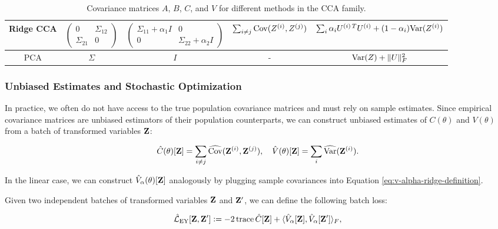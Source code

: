 \begin{table}[h]
\begin{tabular}{|c|c|c|c|c|}
    \hline
    Ridge CCA & $\begin{pmatrix} 
    0 & \Sigma_{12} \\
    \Sigma_{21} & 0
    \end{pmatrix}$ & $\begin{pmatrix}
    \Sigma_{11} + \alpha_1 I & 0 \\
    0 & \Sigma_{22} + \alpha_2 I
    \end{pmatrix}$ & $\sum_{i \neq j} \mathrm{Cov}(Z^{(i)}, Z^{(j)})$ & $\sum_i \alpha_i {U^{(i)\,T}} U^{(i)} +  (1 - \alpha_i) \mathrm{Var}(Z^{(i)})$ \\
    \hline
    PCA & $\Sigma$ & $I$ & - & $\mathrm{Var}(Z) + \|U\|_F^2$ \\
    \hline
    \end{tabular}
    \caption{Covariance matrices $A$, $B$, $C$, and $V$ for different methods in the CCA family.}
    \label{tab:covariance-matrices}
    \end{table}

\subsubsection{Unbiased Estimates and Stochastic Optimization}

In practice, we often do not have access to the true population covariance matrices and must rely on sample estimates. Since empirical covariance matrices are unbiased estimators of their population counterparts, we can construct unbiased estimates of $C(\theta)$ and $V(\theta)$ from a batch of transformed variables $\mathbf{Z}$:

\begin{align}\label{eq:def-C-V-matrices-empirical}
\hat{C}(\theta)[\mathbf{Z}] = \sum_{i \neq j} \widehat{\mathrm{Cov}}(\mathbf{Z}^{(i)}, \mathbf{Z}^{(j)}), \quad
\hat{V}(\theta)[\mathbf{Z}] = \sum_{i} \widehat{\mathrm{Var}}(\mathbf{Z}^{(i)}).
\end{align}

In the linear case, we can construct $\hat{V}_\alpha(\theta)[\mathbf{Z}]$ analogously by plugging sample covariances into Equation \eqref{eq:v-alpha-ridge-definition}.

Given two independent batches of transformed variables $\mathbf{Z}$ and $\mathbf{Z}'$, we can define the following batch loss:

\begin{align}\label{eq:empirical-EY-loss-estimate-def}
\hat{\mathcal{L}}_\text{EY}[\mathbf{Z}, \mathbf{Z}'] \vcentcolon= - 2 \operatorname{trace} \hat{C}[\mathbf{Z}] + \langle \hat{V}_\alpha[\mathbf{Z}], \hat{V}_\alpha[\mathbf{Z}'] \rangle_F,
\end{align}

